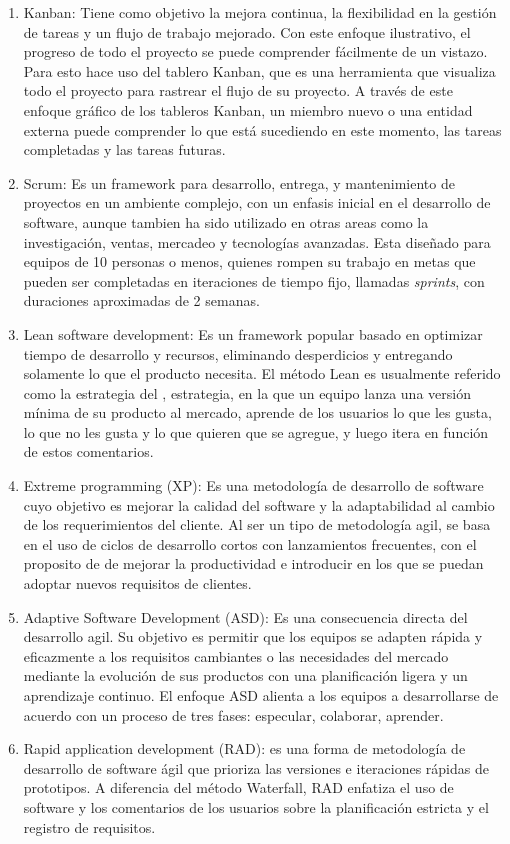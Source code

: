     \begin{enumerate}
        \item Kanban: Tiene como objetivo la mejora continua, la flexibilidad en la gestión de tareas y un flujo de trabajo mejorado. Con este enfoque ilustrativo, el progreso de todo el proyecto se puede comprender fácilmente de un vistazo. Para esto hace uso del tablero Kanban, que es una herramienta que visualiza todo el proyecto para rastrear el flujo de su proyecto. A través de este enfoque gráfico de los tableros Kanban, un miembro nuevo o una entidad externa puede comprender lo que está sucediendo en este momento, las tareas completadas y las tareas futuras.
        \item Scrum: Es un framework para desarrollo, entrega, y mantenimiento de proyectos en un ambiente complejo, con un enfasis inicial en el desarrollo de software, aunque tambien ha sido utilizado en otras areas como la investigación, ventas, mercadeo y tecnologías avanzadas. Esta diseñado para equipos de 10 personas o menos, quienes rompen su trabajo en metas que pueden ser completadas en iteraciones de tiempo fijo, llamadas \emph{sprints}, con duraciones aproximadas de 2 semanas. 
        \item Lean software development: Es un framework popular basado en optimizar tiempo de desarrollo y recursos, eliminando desperdicios y entregando solamente lo que el producto necesita. El método Lean es usualmente referido como la estrategia del , 
        estrategia, en la que un equipo lanza una versión mínima de su producto al mercado, aprende de los usuarios lo que les gusta, lo que no les gusta y lo que quieren que se agregue, y luego itera en función de estos comentarios.
        \item Extreme programming (XP): Es una metodología de desarrollo de software cuyo objetivo es mejorar la calidad del software y la adaptabilidad al cambio de los requerimientos del cliente. Al ser un tipo de metodología agil, se basa en el uso de ciclos de desarrollo cortos con lanzamientos frecuentes, con el proposito de de mejorar la productividad e introducir  en los que se puedan adoptar nuevos requisitos de clientes.
        \item Adaptive Software Development (ASD): Es una consecuencia directa del desarrollo agil. Su objetivo es permitir que los equipos se adapten rápida y eficazmente a los requisitos cambiantes o las necesidades del mercado mediante la evolución de sus productos con una planificación ligera y un aprendizaje continuo. El enfoque ASD alienta a los equipos a desarrollarse de acuerdo con un proceso de tres fases: especular, colaborar, aprender. 
        \item Rapid application development (RAD):  es una forma de metodología de desarrollo de software ágil que prioriza las versiones e iteraciones rápidas de prototipos. A diferencia del método Waterfall, RAD enfatiza el uso de software y los comentarios de los usuarios sobre la planificación estricta y el registro de requisitos.
    \end{enumerate}
